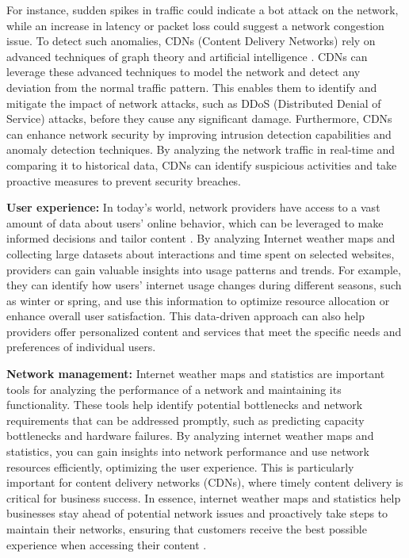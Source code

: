 \documentclass[sigconf,authorversion,nonacm]{acmart}
\begin{document}
For instance, sudden spikes in traffic could indicate a bot attack on the network, while an increase in latency or packet loss could suggest a network congestion issue. To detect such anomalies, CDNs (Content Delivery Networks) rely on advanced techniques of graph theory and artificial intelligence \cite{6932930}.  CDNs can leverage these advanced techniques to model the network and detect any deviation from the normal traffic pattern. This enables them to identify and mitigate the impact of network attacks, such as DDoS (Distributed Denial of Service) attacks, before they cause any significant damage. Furthermore, CDNs can enhance network security by improving intrusion detection capabilities and anomaly detection techniques. By analyzing the network traffic in real-time and comparing it to historical data, CDNs can identify suspicious activities and take proactive measures to prevent security breaches. 

\textbf{User experience:} In today's world, network providers have access to a vast amount of data about users' online behavior, which can be leveraged to make informed decisions and tailor content \cite{2015}. By analyzing Internet weather maps and collecting large datasets about interactions and time spent on selected websites, providers can gain valuable insights into usage patterns and trends. For example, they can identify how users' internet usage changes during different seasons, such as winter or spring, and use this information to optimize resource allocation or enhance overall user satisfaction. This data-driven approach can also help providers offer personalized content and services that meet the specific needs and preferences of individual users.

\textbf{Network management:} Internet weather maps and statistics are important tools for analyzing the performance of a network and maintaining its functionality. These tools help identify potential bottlenecks and network requirements that can be addressed promptly, such as predicting capacity bottlenecks and hardware failures. By analyzing internet weather maps and statistics, you can gain insights into network performance and use network resources efficiently, optimizing the user experience. This is particularly important for content delivery networks (CDNs), where timely content delivery is critical for business success. In essence, internet weather maps and statistics help businesses stay ahead of potential network issues and proactively take steps to maintain their networks, ensuring that customers receive the best possible experience when accessing their content \cite{1235600}.
\end{document}
